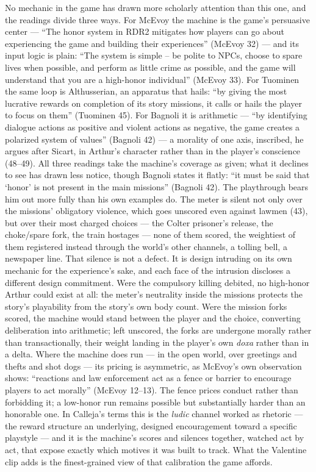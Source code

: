 \documentclass{article}
\begin{document}
No mechanic in the game has drawn more scholarly attention than this one, and the readings divide three ways. For McEvoy the machine is the game's persuasive center — ``The honor system in RDR2 mitigates how players can go about experiencing the game and building their experiences'' (McEvoy 32) — and its input logic is plain: ``The system is simple -- be polite to NPCs, choose to spare lives when possible, and perform as little crime as possible, and the game will understand that you are a high-honor individual'' (McEvoy 33). For Tuominen the same loop is Althusserian, an apparatus that hails: ``by giving the most lucrative rewards on completion of its story missions, it calls or hails the player to focus on them'' (Tuominen 45). For Bagnoli it is arithmetic — ``by identifying dialogue actions as positive and violent actions as negative, the game creates a polarized system of values'' (Bagnoli 42) — a morality of one axis, inscribed, he argues after Sicart, in Arthur's character rather than in the player's conscience (48--49). All three readings take the machine's coverage as given; what it declines to see has drawn less notice, though Bagnoli states it flatly: ``it must be said that `honor' is not present in the main missions'' (Bagnoli 42). The playthrough bears him out more fully than his own examples do. The meter is silent not only over the missions' obligatory violence, which goes unscored even against lawmen (43), but over their most charged choices — the Colter prisoner's release, the choke/spare fork, the train hostages — none of them scored, the weightiest of them registered instead through the world's other channels, a tolling bell, a newspaper line. That silence is not a defect. It is design intruding on its own mechanic for the experience's sake, and each face of the intrusion discloses a different design commitment. Were the compulsory killing debited, no high-honor Arthur could exist at all: the meter's neutrality inside the missions protects the story's playability from the story's own body count. Were the mission forks scored, the machine would stand between the player and the choice, converting deliberation into arithmetic; left unscored, the forks are undergone morally rather than transactionally, their weight landing in the player's own \textit{doxa} rather than in a delta. Where the machine does run — in the open world, over greetings and thefts and shot dogs — its pricing is asymmetric, as McEvoy's own observation shows: ``reactions and law enforcement act as a fence or barrier to encourage players to act morally'' (McEvoy 12--13). The fence prices conduct rather than forbidding it; a low-honor run remains possible but substantially harder than an honorable one. In Calleja's terms this is the \textit{ludic} channel worked as rhetoric — the reward structure an underlying, designed encouragement toward a specific playstyle — and it is the machine's scores and silences together, watched act by act, that expose exactly which motives it was built to track. What the Valentine clip adds is the finest-grained view of that calibration the game affords.
\end{document}
